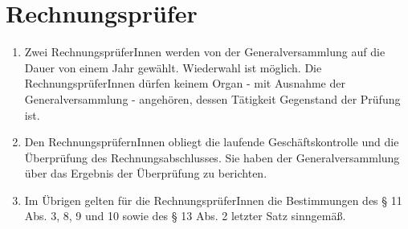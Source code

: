 \documentclass[a4paper,12pt]{article}
\newcommand{\comment}[1]{{\bf /*Komm.:} \textit{#1} {\bf */}}
\def\comment#1{}
\begin{document}
\section{Rechnungsprüfer} %
\begin{enumerate}
\item Zwei RechnungsprüferInnen werden von der Generalversammlung auf die Dauer von einem Jahr gewählt. Wiederwahl ist möglich. Die
RechnungsprüferInnen dürfen keinem Organ - mit Ausnahme
der Generalversammlung - angehören, dessen Tätigkeit Gegenstand der
Prüfung ist.
\comment{Änderung: Prüfer jetzt wie Vorstand auf 1 Jahr}

\item Den RechnungsprüfernInnen obliegt die laufende Geschäftskontrolle und die Überprüfung des Rechnungsabschlusses. Sie haben der Generalversammlung über das Ergebnis der Überprüfung zu berichten.
\comment{Orig. Vorlage: "Den Rechnungsprüfern obliegt die laufende Geschäftskontrolle sowie die Prüfung der Finanzgebarung des Vereins im Hinblick auf die Ordnungsmäßigkeit der Rechnungslegung und die statutengemäße Verwendung der Mittel. Der Vorstand hat den Rechnungsprüfern die erforderlichen Unterlagen vorzulegen und die erforderlichen Auskünfte zu erteilen. Die Rechnungsprüfer haben dem Vorstand über das Ergebnis der Prüfung zu berichten."}

\item Im Übrigen gelten für die RechnungsprüferInnen die Bestimmungen des § 11 Abs. 3, 8, 9 und 10 sowie des § 13 Abs. 2 letzter Satz sinngemäß.
\comment{Was heist das ? Vermutlich (aus dem orig. Vorlage) : "(3) Rechtsgeschäfte zwischen Rechnungsprüfern und Verein bedürfen der Genehmigung durch die Generalversammlung. Im Übrigen gelten für die Rechnungsprüfer die Bestimmungen des § 11 Abs. 8 bis 10 sinngemäß."}

\end{enumerate}
\end{document}
